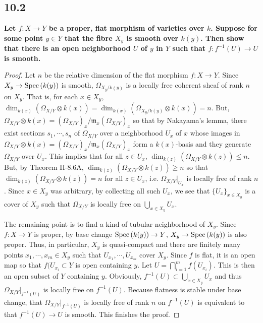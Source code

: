 \documentclass[11pt]{amsart}          %
\newcommand{\spec}{{\rm Spec}}
\begin{document}
\subsection*{10.2}\textbf{Let $f: X \to Y$ be a proper, flat morphism of varieties over $k$. Suppose for some point $y \in Y$ that the fibre $X_y$ is smooth over $k(y)$. Then show that there is an open neighborhood $U$ of $y$ in $Y$ such that $f: f^{-1} (U) \to U$ is smooth.}

\begin{proof}Let $n$ be the relative dimension of the flat morphism $f: X \to Y$. Since $X_y \to \spec \left( k(y) \right)$ is smooth, $\Omega_{X_y/ k(y)}$ is a locally free coherent sheaf of rank $n$ on $X_y$. That is, for each $x \in X_y$, $\dim _{k(x)} \left( \Omega_{X/Y} \otimes k(x) \right) = \dim _{k(x)} \left( \Omega_{X_y/ k(y)} \otimes k(x) \right) = n$. But, $\Omega_{X/Y} \otimes k(x) = \left( \Omega_{X/Y} \right) _x / \mathfrak{m}_x \left( \Omega_{X/Y} \right)_x$ so that by Nakayama's lemma, there exist sections $s_1, \cdots, s_n$ of $\Omega _{X/Y}$ over a neighborhood $U_x$ of $x$ whose images in $\Omega_{X/Y} \otimes k(x) = \left( \Omega_{X/Y} \right) _x / \mathfrak{m}_x \left( \Omega_{X/Y} \right)_x$ form a $k(x)$-basis and they generate $\Omega_{X/Y}$ over $U_x$. This implies that for all $z \in U_x$, $\dim _{k(z)} \left( \Omega_{X/Y} \otimes k(z) \right) \leq n$. But, by Theorem II-8.6A, $\dim _{k(z)} \left( \Omega_{X/Y} \otimes k(z) \right) \geq n$ so that $\dim _{k(z)} \left( \Omega_{X/Y} \otimes k(z) \right) = n$ for all $z \in U_x$, i.e. $\Omega_{X/Y} |_{U_x}$ is locally free of rank $n$. Since $x \in X_y$ was arbitrary, by collecting all such $U_x$, we see that $\{ U_x \} _{x \in X_y}$ is a cover of $X_y$ such that $\Omega_{X/Y}$ is locally free on $\bigcup_{x \in X_y} U_x$.

The remaining point is to find a kind of tubular neighborhood of $X_y$. Since $f: X \to Y$ is proper, by base change $\spec \left( k(y) \right) \to Y$, $X_y \to \spec \left( k(y) \right)$ is also proper. Thus, in particular, $X_y$ is quasi-compact and there are finitely many points $x_1, \cdots, x_m \in X_y$ such that $U_{x_1}, \cdots, U_{x_m}$ cover $X_y$. Since $f$ is flat, it is an open map so that $f(U_{x_i} \subset Y$ is open containing $y$. Let $U = \bigcap_{i=1} ^m f(U_{x_i})$. This is then an open subset of $Y$ containing $y$. Obviously, $f^{-1} (U) \subset \bigcup _{x \in X_y} U_x$ and thus $\Omega_{X/Y} |_{f^{-1} (U)}$ is locally free on $f^{-1} (U)$. Because flatness is stable under base change, that $\Omega_{X/Y} |_{f^{-1} (U)}$ is locally free of rank $n$ on $f^{-1} (U)$ is equivalent to that $f^{-1} (U) \to U$ is smooth. This finishes the proof.
\end{proof}
\end{document}
